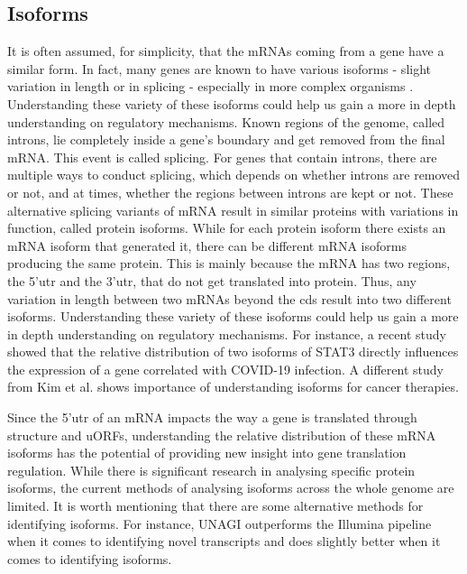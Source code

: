 \documentclass[12pt]{article}
\begin{document}
    
\subsection{Isoforms}
It is often assumed, for simplicity, that the mRNAs coming from a gene have a similar form. In fact, many genes are known to have various isoforms - slight variation in length or in splicing - especially in more complex organisms \cite{Rees2003, Hunt1992}. Understanding these variety of these isoforms could help us gain a more in depth understanding on regulatory mechanisms. Known regions of the genome, called introns, lie completely inside a gene's boundary and get removed from the final mRNA. This event is called splicing. For genes that contain introns, there are multiple ways to conduct splicing, which depends on whether introns are removed or not, and at times, whether the regions between introns are kept or not. These alternative splicing variants of mRNA result in similar proteins with variations in function, called protein isoforms. 
While for each protein isoform there exists an mRNA isoform that generated it, there can be different mRNA isoforms producing the same protein. This is mainly because the mRNA has two regions, the 5'\acrshort{utr} and the 3'\acrshort{utr}, that do not get translated into protein. Thus, any variation in length between two mRNAs beyond the \gls{cds} result into two different isoforms. Understanding these variety of these isoforms could help us gain a more in depth understanding on regulatory mechanisms. For instance, a recent study \cite{Shamir2020} showed that the relative distribution of two isoforms of STAT3 directly influences the expression of a gene correlated with COVID-19 infection. A different study from Kim et al. \cite{Kim2009} shows importance of understanding isoforms for cancer therapies. 

Since the 5'\acrshort{utr} of an mRNA impacts the way a gene is translated through structure and uORFs, understanding the relative distribution of these mRNA isoforms has the potential of providing new insight into gene translation regulation.  While there is significant research in analysing specific protein isoforms, the current methods of analysing isoforms across the whole genome are limited.  It is worth mentioning that there are some alternative methods for identifying isoforms. For instance, UNAGI\cite{Alkadi2020} outperforms the Illumina pipeline when it comes to identifying novel transcripts and does slightly better when it comes to identifying isoforms. 
\end{document}
